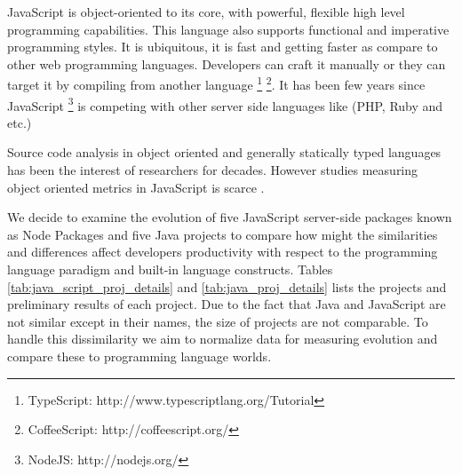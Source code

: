JavaScript is object-oriented to its core, with powerful, flexible high level programming capabilities. This language also supports functional and imperative programming styles. It is ubiquitous, it is fast and getting faster as compare to other web programming languages. Developers can craft it manually or they can target it by compiling from another language \footnote{TypeScript: http://www.typescriptlang.org/Tutorial} \footnote{CoffeeScript: http://coffeescript.org/}. It has been few years since JavaScript \footnote{NodeJS: http://nodejs.org/} is competing with other server side languages like (PHP, Ruby and etc.)

Source code analysis in object oriented and generally statically typed languages has been the interest of researchers for decades. However studies measuring object oriented metrics in JavaScript is scarce \cite{Richards:2010:ADB:1809028.1806598} \cite{6320536}.

We decide to examine the evolution of five JavaScript server-side packages known as Node Packages and five Java projects to compare how might the similarities and differences affect developers productivity with respect to the programming language paradigm and built-in language constructs. Tables \ref{tab:java_script_proj_details} and \ref{tab:java_proj_details} lists the projects and preliminary results of each project. Due to the fact that Java and JavaScript are not similar except in their names, the size of projects are not comparable. To handle this dissimilarity we aim to normalize data for measuring evolution and compare these to programming language worlds.